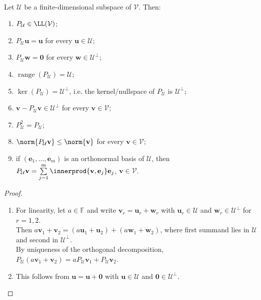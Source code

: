 \begin{proposition} \label{prop:orthogonal-projection-properties} \\
Let $\mathcal{U}$ be a finite-dimensional subspace of $\mathcal{V}$. Then:
\begin{enumerate}[label=\roman*.]
\setlength{\itemsep}{0pt}
\item $P_{\mathcal{U}}\in\LL(\mathcal{V})$;
\item $P_{\mathcal{U}}\mathbf{u}=\mathbf{u}$ for every $\mathbf{u}\in\mathcal{U}$;
\item $P_{\mathcal{U}}\mathbf{w}=\mathbf{0}$ for every $\mathbf{w}\in\mathcal{U}^{\perp}$;
\item $\operatorname{range}(P_{\mathcal{U}})=\mathcal{U}$;
\item $\ker(P_{\mathcal{U}})=\mathcal{U}^{\perp}$, i.e. the kernel/nullspace of $P_{\mathcal{U}}$ is $\mathcal{U}^{\perp}$;
\item $\mathbf{v}-P_{\mathcal{U}}\mathbf{v}\in\mathcal{U}^{\perp}$ for every $\mathbf{v}\in\mathcal{V}$;
\item $P_{\mathcal{U}}^2=P_{\mathcal{U}}$;
\item $\norm{P_{\mathcal{U}}\mathbf{v}}\leq\norm{\mathbf{v}}$ for every $\mathbf{v}\in\mathcal{V}$;
\item if $(\mathbf{e}_1,\ldots,\mathbf{e}_m)$ is an orthonormal basis of $\mathcal{U}$, then $P_{\mathcal{U}}\mathbf{v}=\sum\limits_{j=1}^{m}\innerprod{\mathbf{v},\mathbf{e}_j}\mathbf{e}_j$, $\mathbf{v}\in\mathcal{V}$.
\end{enumerate}
\begin{proof}
\begin{enumerate}[label=(\roman*)]
\setlength{\itemsep}{0pt}
\item For linearity, let $a\in\mathbb{F}$ and write $\mathbf{v}_r=\mathbf{u}_r+\mathbf{w}_r$ with $\mathbf{u}_r\in\mathcal{U}$ and $\mathbf{w}_r\in\mathcal{U}^{\perp}$ for $r=1,2$.\\
Then $a\mathbf{v}_1+\mathbf{v}_2=(a\mathbf{u}_1+\mathbf{u}_2)+(a\mathbf{w}_1+\mathbf{w}_2)$, where first summand lies in $\mathcal{U}$ and second in $\mathcal{U}^{\perp}$.\\
By uniqueness of the orthogonal decomposition, $P_{\mathcal{U}}(a\mathbf{v}_1+\mathbf{v}_2)=aP_{\mathcal{U}}\mathbf{v}_1+P_{\mathcal{U}}\mathbf{v}_2$.
\item This follows from $\mathbf{u}=\mathbf{u}+\mathbf{0}$ with $\mathbf{u}\in\mathcal{U}$ and $\mathbf{0}\in\mathcal{U}^{\perp}$.

\end{enumerate}
\end{proof}
\end{proposition}
